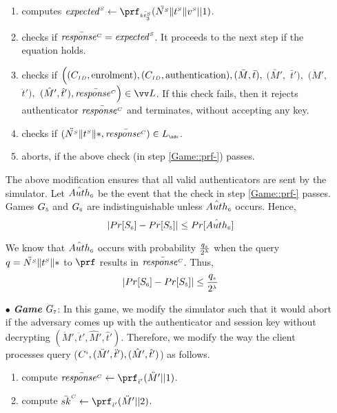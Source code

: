 \begin{itemize}
\begin{enumerate}
%
\item computes $\VS{\mathit{expected}} \gets \prf_{\sss\bar{\VS{\keyt_{\sss3}}}}(\ddot{\VS{\nonce}}  \| \VS{\trans} \| \VS{\verifier}||1)$.
%
\item checks if $\bar{\mathit{response}^{\scriptscriptstyle C}}=\mathit{expected}^{\scriptscriptstyle S}$. It proceeds to the next step if the equation holds. 
%
\item\label{Game::check-sim-} checks if $\Big((C_{\scriptscriptstyle  ID},  \text{enrolment}), (C_{\scriptscriptstyle  ID},  \text{authentication}), (\bar M, \bar t),$ $ (\bar M',$ $ \bar t'),$ $ (\ddot M', $ $\ddot t'), $ $(\hat M', \hat t'), \bar{\VC{\mathit{response}}}\Big)\in \vv L$. If this check fails, then it rejects authenticator  $\bar{\mathit{response}^{\scriptscriptstyle C}}$ and terminates, without accepting any key.

\item\label{Game::prf-} checks if $(\ddot{\VS{\nonce}}  \| \VS{\trans} \| *,\bar{\VC{\mathit{response}}})\in L_{\sss \adv}$.  
%
\item aborts, if the above check (in step \ref{Game::prf-}) passes.
%
\end{enumerate}

The above modification ensures that all valid authenticators are sent by the simulator. Let $\hat {Auth}_{\scriptscriptstyle  6}$ be the event that the check in step \ref{Game::prf-} passes. Games $G_{\scriptscriptstyle  5}$ and $G_{\scriptscriptstyle  6}$ are indistinguishable unless $\hat {Auth}_{\scriptscriptstyle  6}$ occurs. Hence,
%
$$|Pr[S_{\scriptscriptstyle  6}]-Pr[S_{\scriptscriptstyle  5}]|\leq Pr[\hat {Auth}_{\scriptscriptstyle  6}]$$


We know that $\hat {Auth}_{\scriptscriptstyle  6}$ occurs with probability $ \frac{q_{\scriptscriptstyle  s}}{2^{\scriptscriptstyle \lambda}}$ when the query $q=\ddot{{N}^{\scriptscriptstyle S}}  \| {t}^{\scriptscriptstyle S} \| *$ to $\prf$ results in $\bar{\mathit{response}^{\scriptscriptstyle C}}$. Thus, 
%
\begin{equation}\label{eq::game_6}
|Pr[S_{\scriptscriptstyle  6}]-Pr[S_{\scriptscriptstyle  5}]|\leq \frac{q_{\scriptscriptstyle  s}}{2^{\scriptscriptstyle \lambda}}
\end{equation}

\item[$\bullet$] \textit{\textbf{Game}}  $G_{\scriptscriptstyle  7}$: In this game, we modify the simulator such that it would abort if the adversary comes up with the authenticator and session key without decrypting  $ (\ddot M', \ddot t', \hat M', \hat t')$.  Therefore, we modify  the way the client processes query \send($C^{\scriptscriptstyle  i}, (\ddot M', \ddot t'), (\hat M', \hat t')$) as follows.
 \begin{enumerate}
 \item compute $\bar{\VC{\mathit{response}}} \gets \prf_{\sss  \ddot t'}( \ddot M'|| 1)$.
 \item compute $\bar {sk}^{\sss C}\gets \prf_{\sss  \ddot t'}( \ddot M'|| 2)$.
 \end{enumerate}


\end{itemize}
